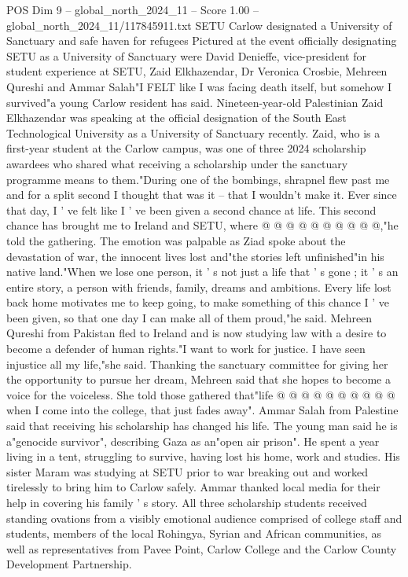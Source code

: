 \begin{textsample}{POS Dim 9 – global\_north\_2024\_11 – Score 1.00 – global\_north\_2024\_11/117845911.txt}  \label{ex:f9_pos_407}
SETU Carlow designated a University of Sanctuary and safe haven for refugees Pictured at the event officially designating SETU as a University of Sanctuary were David Denieffe, vice-president for student experience at SETU, Zaid Elkhazendar, Dr Veronica Crosbie, Mehreen Qureshi and Ammar Salah"I FELT like I was facing death itself, but somehow I survived"a young Carlow resident has said.
Nineteen-year-old Palestinian Zaid Elkhazendar was speaking at the official designation of the South East Technological University as a University of Sanctuary recently.
Zaid, who is a first-year student at the Carlow campus, was one of three 2024 scholarship awardees who shared what receiving a scholarship under the sanctuary programme means to them."During one of the bombings, shrapnel flew past me and for a split second I thought that was it -- that I wouldn't make it.
Ever since that day, I ' ve felt like I ' ve been given a second chance at life.
This second chance has brought me to Ireland and SETU, where @ @ @ @ @ @ @ @ @ @,"he told the gathering.
The emotion was palpable as Ziad spoke about the devastation of war, the innocent lives lost and"the stories left unfinished"in his native land."When we lose one person, it ' s not just a life that ' s gone ; it ' s an entire story, a person with friends, family, dreams and ambitions.
Every life lost back home motivates me to keep going, to make something of this chance I ' ve been given, so that one day I can make all of them proud,"he said.
Mehreen Qureshi from Pakistan fled to Ireland and is now studying law with a desire to become a defender of human rights."I want to work for justice.
I have seen injustice all my life,"she said.
Thanking the sanctuary committee for giving her the opportunity to pursue her dream, Mehreen said that she hopes to become a voice for the voiceless.
She told those gathered that"life @ @ @ @ @ @ @ @ @ @ when I come into the college, that just fades away".
Ammar Salah from Palestine said that receiving his scholarship has changed his life.
The young man said he is a"genocide survivor", describing Gaza as an"open air prison".
He spent a year living in a tent, struggling to survive, having lost his home, work and studies.
His sister Maram was studying at SETU prior to war breaking out and worked tirelessly to bring him to Carlow safely.
Ammar thanked local media for their help in covering his family ' s story.
All three scholarship students received standing ovations from a visibly emotional audience comprised of college staff and students, members of the local Rohingya, Syrian and African communities, as well as representatives from Pavee Point, Carlow College and the Carlow County Development Partnership.

\end{textsample}
